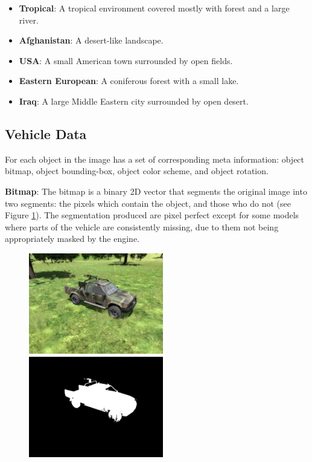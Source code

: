 \begin{itemize}
    \item \textbf{Tropical}: A tropical environment covered mostly with forest and a large river.
    \item \textbf{Afghanistan}: A desert-like landscape.
    \item \textbf{USA}: A small American town surrounded by open fields.
    \item \textbf{Eastern European}: A coniferous forest with a small lake.
    \item \textbf{Iraq}: A large Middle Eastern city surrounded by open desert.
\end{itemize}

\subsection{Vehicle Data}\label{vehicle-data}
For each object in the image has a set of corresponding meta information: object bitmap, object bounding-box, object color scheme, and object rotation.

\textbf{Bitmap}: The bitmap is a binary 2D vector that segments the original image into two segments: the pixels which contain the object, and those who do not (see Figure \ref{bitmap}). The segmentation produced are pixel perfect except for some models where parts of the vehicle are consistently missing, due to them not being appropriately masked by the engine.

\begin{figure}[H]
\centering
{}
  {\includegraphics[height=4.4cm]{images/vbs3/bitmap/example3.jpg}}
%
  {\includegraphics[height=4.4cm]{images/vbs3/bitmap/example3-bitmap.jpg}}
  \caption{}
\label{bitmap}
\end{figure}

